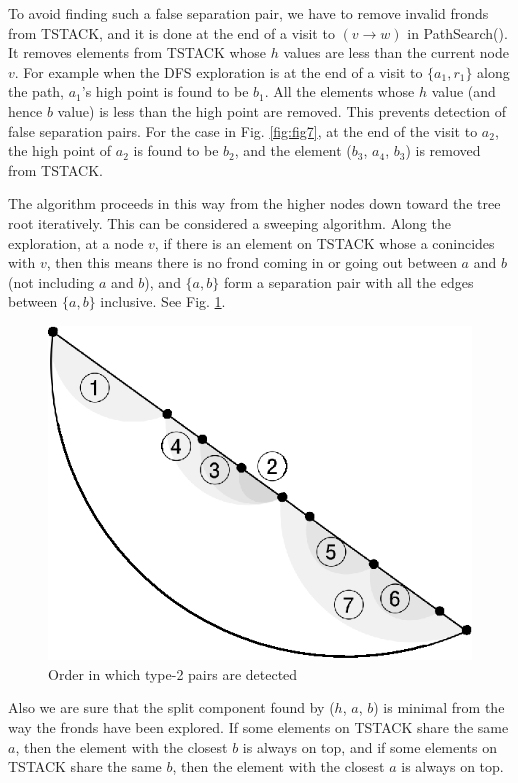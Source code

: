 \documentclass[twoside,twocolumn]{article}
\begin{document}
To avoid finding such a false separation pair, we have to remove invalid fronds
from {\ttfamily TSTACK}, and it is done at the end of a visit to $(v \rightarrow w)$ in {\ttfamily PathSearch()}.
It removes elements from {\ttfamily TSTACK} whose $h$ values are less than the current
node $v$. For example when the DFS exploration is at the end of a visit to
$\{a_1,r_1\}$ along the path, $a_1$'s high point is found to be $b_1$.
All the elements whose $h$ value (and hence $b$ value) is less than the high point
 are removed. This prevents detection of false separation pairs.
For the case in Fig. \ref{fig:fig7}, at the end of the visit to $a_2$, the high point of $a_2$
is found to be $b_2$, and the element ($b_3$, $a_4$, $b_3$) is removed from {\ttfamily TSTACK}.

The algorithm proceeds in this way from the higher nodes down toward the tree
 root iteratively. This can be considered a sweeping algorithm.
Along the exploration, at a node $v$, if there is an element on {\ttfamily TSTACK} whose a
conincides with $v$, then this means there is no frond coming in or going out
between $a$ and $b$ (not including $a$ and $b$), and $\{a,b\}$ form a separation pair with
 all the edges between $\{a,b\}$ inclusive. See Fig. \ref{fig:fig8}.

\begin{figure}[!htb]
\centering
\includegraphics[scale=1.0]{spqr_fig8.eps}
\caption{Order in which type-2 pairs are detected}
\label{fig:fig8}
\end{figure}


Also we are sure that the split component found by ($h$, $a$, $b$) is minimal from
the way the fronds have been explored. If some elements on {\ttfamily TSTACK} share the
same $a$, then the element with the closest $b$ is always on top, and if some
elements on {\ttfamily TSTACK} share the same $b$, then the element with the closest $a$ is
always on top.
\end{document}
